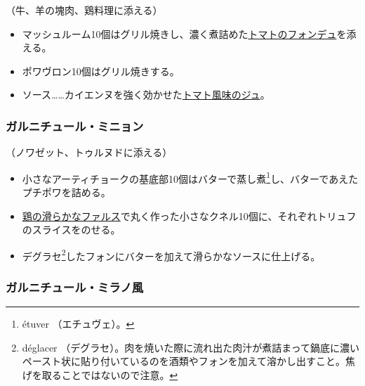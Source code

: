 \begin{recette}


（牛、羊の塊肉、鶏料理に添える）

\begin{itemize}
\item
  マッシュルーム10個はグリル焼きし、濃く煮詰めた\protect\hyperlink{portugaise}{トマトのフォンデュ}を添える。
\item
  ポワヴロン10個はグリル焼きする。
\item
  ソース\ldots{}\ldots{}カイエンヌを強く効かせた\protect\hyperlink{jus-lie-tomate}{トマト風味のジュ}。
\end{itemize}

\hypertarget{garniture-mignon}{%
\subsubsection{ガルニチュール・ミニョン}\label{garniture-mignon}}



（ノワゼット、トゥルヌドに添える）

\begin{itemize}
\item
  小さなアーティチョークの基底部10個はバターで蒸し煮\footnote{étuver
    （エチュヴェ）。}し、バターであえたプチポワを詰める。
\item
  \protect\hyperlink{farce-b}{鶏の滑らかなファルス}で丸く作った小さなクネル10個に、それぞれトリュフのスライスをのせる。
\item
  デグラセ\footnote{déglacer
    （デグラセ）。肉を焼いた際に流れ出た肉汁が煮詰まって鍋底に濃いペースト状に貼り付いているのを酒類やフォンを加えて溶かし出すこと。焦げを取ることではないので注意。}したフォンにバターを加えて滑らかなソースに仕上げる。
\end{itemize}

\hypertarget{garniture-a-la-milanaise}{%
\subsubsection{ガルニチュール・ミラノ風}\label{garniture-a-la-milanaise}}


\end{recette}
